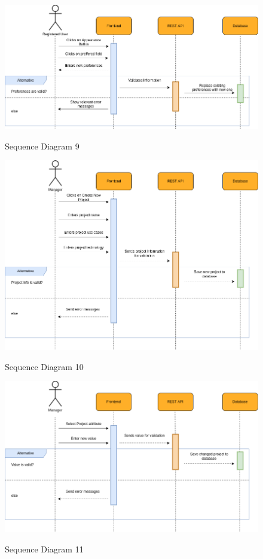 \begin{figure}[H]
    \centering
    \caption{Sequence Diagram 9}
    \includegraphics[scale=0.5]{./diagrams/sequence/seq-09.png}
    \label{fig:seq-09}
    
\end{figure}


\begin{figure}[H]
    \centering
    \caption{Sequence Diagram 10}
    \includegraphics[scale=0.5]{./diagrams/sequence/seq-10.png}
    \label{fig:seq-10}
    
\end{figure}


\begin{figure}[H]
    \centering
    \caption{Sequence Diagram 11}
    \includegraphics[scale=0.5]{./diagrams/sequence/seq-11.png}
    \label{fig:seq-11}
    
\end{figure}


